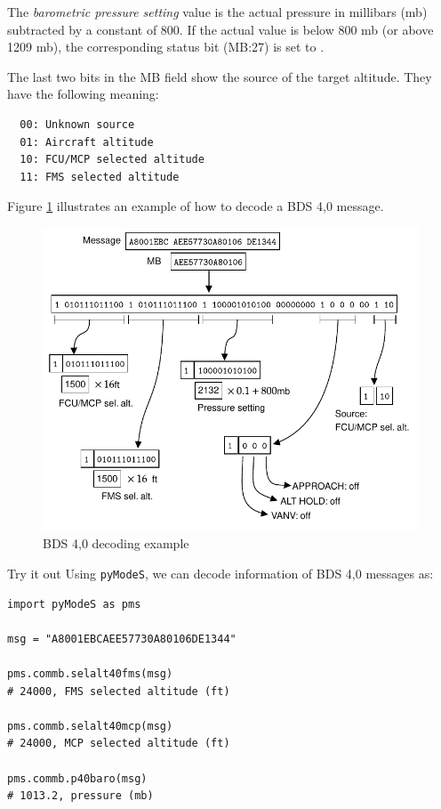 The \emph{barometric pressure setting} value is the actual pressure in millibars (mb) subtracted by a constant of 800. If the actual value is below 800 mb (or above 1209 mb), the corresponding status bit (MB:27) is set to \0.

The last two bits in the MB field show the source of the target altitude. They have the following meaning:

\begin{verbatim}
  00: Unknown source
  01: Aircraft altitude
  10: FCU/MCP selected altitude
  11: FMS selected altitude
\end{verbatim}


Figure \ref{fig:bds40_example} illustrates an example of how to decode a BDS 4,0 message.

\begin{figure}[ht]
  \centering
  \includegraphics[scale=0.9]{figures/mode_s/bds40_example.pdf}
  \caption{BDS 4,0 decoding example}
  \label{fig:bds40_example}
\end{figure}

\begin{notebox}{Try it out}
Using \texttt{pyModeS}, we can decode information of BDS 4,0 messages as: 

\begin{verbatim}
import pyModeS as pms

msg = "A8001EBCAEE57730A80106DE1344"

pms.commb.selalt40fms(msg)
# 24000, FMS selected altitude (ft)

pms.commb.selalt40mcp(msg)
# 24000, MCP selected altitude (ft)

pms.commb.p40baro(msg)
# 1013.2, pressure (mb)
\end{verbatim}

\end{notebox}


